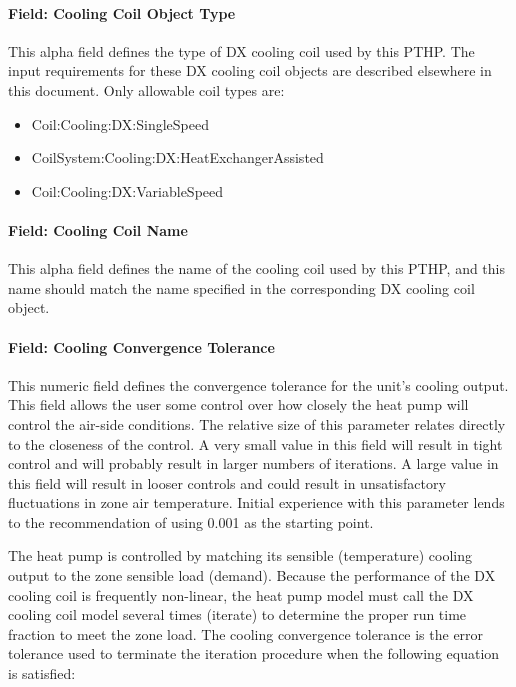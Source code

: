 \paragraph{Field: Cooling Coil Object Type}\label{field-cooling-coil-object-type-4-000}

This alpha field defines the type of DX cooling coil used by this PTHP. The input requirements for these DX cooling coil objects are described elsewhere in this document. Only allowable coil types are:

\begin{itemize}
\item
  Coil:Cooling:DX:SingleSpeed
\item
  CoilSystem:Cooling:DX:HeatExchangerAssisted
\item
  Coil:Cooling:DX:VariableSpeed
\end{itemize}

\paragraph{Field: Cooling Coil Name}\label{field-cooling-coil-name-3-000}

This alpha field defines the name of the cooling coil used by this PTHP, and this name should match the name specified in the corresponding DX cooling coil object.

\paragraph{Field: Cooling Convergence Tolerance}\label{field-cooling-convergence-tolerance-3}

This numeric field defines the convergence tolerance for the unit's cooling output. This field allows the user some control over how closely the heat pump will control the air-side conditions. The relative size of this parameter relates directly to the closeness of the control. A very small value in this field will result in tight control and will probably result in larger numbers of iterations. A large value in this field will result in looser controls and could result in unsatisfactory fluctuations in zone air temperature. Initial experience with this parameter lends to the recommendation of using 0.001 as the starting point.

The heat pump is controlled by matching its sensible (temperature) cooling output to the zone sensible load (demand). Because the performance of the DX cooling coil is frequently non-linear, the heat pump model must call the DX cooling coil model several times (iterate) to determine the proper run time fraction to meet the zone load. The cooling convergence tolerance is the error tolerance used to terminate the iteration procedure when the following equation is satisfied:


